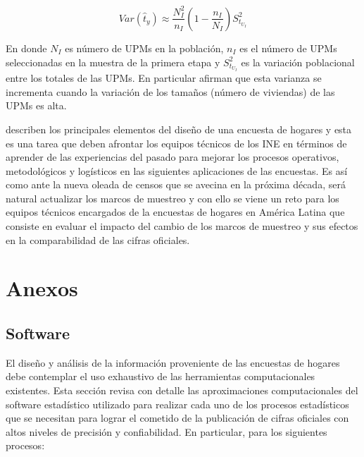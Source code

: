 \[Var(\hat{t}_y) \approx \frac{N_I^2}{n_I}\left(1-\frac{n_I}{N_I}\right)S^2_{t_{U_I}} \]

En donde \(N_I\) es número de UPMs en la población, \(n_I\) es el número de UPMs seleccionadas en la muestra de la primera etapa y \(S^2_{t_{U_I}}\) es la variación poblacional entre los totales de las UPMs. En particular \citet[pág. 144]{SSW_2003} afirman que esta varianza se incrementa cuando la variación de los tamaños (número de viviendas) de las UPMs es alta.

\citet{Beland_Dale_Dufour_Hamel_2005} describen los principales elementos del diseño de una encuesta de hogares y esta es una tarea que deben afrontar los equipos técnicos de los INE en términos de aprender de las experiencias del pasado para mejorar los procesos operativos, metodológicos y logísticos en las siguientes aplicaciones de las encuestas. Es así como ante la nueva oleada de censos que se avecina en la próxima década, será natural actualizar los marcos de muestreo y con ello se viene un reto para los equipos técnicos encargados de la encuestas de hogares en América Latina que consiste en evaluar el impacto del cambio de los marcos de muestreo y sus efectos en la comparabilidad de las cifras oficiales.

\hypertarget{anexos}{%
\chapter*{Anexos}\label{anexos}}


\hypertarget{software}{%
\section*{Software}\label{software}}


El diseño y análisis de la información proveniente de las encuestas de hogares debe contemplar el uso exhaustivo de las herramientas computacionales existentes. Esta sección revisa con detalle las aproximaciones computacionales del software estadístico utilizado para realizar cada uno de los procesos estadísticos que se necesitan para lograr el cometido de la publicación de cifras oficiales con altos niveles de precisión y confiabilidad. En particular, para los siguientes procesos:

